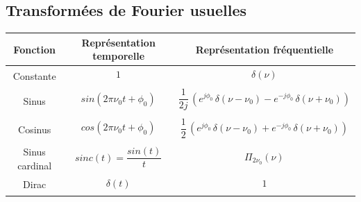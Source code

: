 \subsection*{Transformées de Fourier usuelles}
\bigskip
\begingroup
\setlength{\tabcolsep}{6pt} %
\renewcommand{\arraystretch}{2} %
\begin{center}
\begin{tabular}{|c|c|c|}
\hline
\textbf{Fonction} & \textbf{Représentation temporelle} & \textbf{Représentation fréquentielle} \\ 
\hline
\multirow{2}{*}{Constante} & $1$ & $\delta(\nu)$ \\
&  
& \\
\hline
\multirow{2}{*}{Sinus} & $sin(2\pi\nu_0t+\phi_0)$ & $\dfrac{1}{2j}\,(e^{j\phi_0}\,\delta(\nu-\nu_0) - e^{-j\phi_0}\,\delta(\nu+\nu_0))$ \\
&  
& \\
\hline
\multirow{2}{*}{Cosinus} & $cos(2\pi\nu_0t+\phi_0)$ & $\dfrac{1}{2}\,(e^{j\phi_0}\,\delta(\nu-\nu_0) + e^{-j\phi_0}\,\delta(\nu+\nu_0))$ \\
&  
& \\
\hline
\multirow{2}{*}{Sinus cardinal} & $sinc(t) = \dfrac{sin(t)}{t}$ & $ \Pi_{2\nu_0}(\nu) $ \\[2ex]
&  
& \\
\hline
\multirow{2}{*}{Dirac} & $\delta(t)$ & $1$ \\
&  
& \\
\hline
\end{tabular}
\end{center}

\pagebreak


